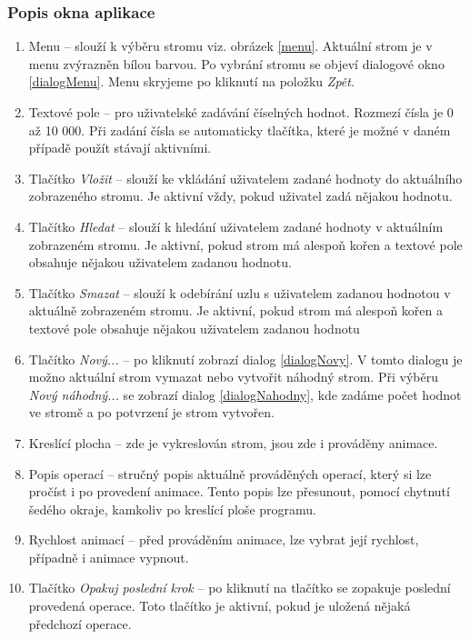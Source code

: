 \documentclass[
  biblatex=false,
  font=serif,
  glossaries=false,
  tables=false,
  theorems=false,
  index
]{kidiplom}
\begin{document}
\subsubsection{Popis okna aplikace} 
\begin{enumerate}
\item Menu -- slouží k výběru stromu viz. obrázek \ref{menu}. Aktuální strom je v menu zvýrazněn bílou barvou. Po vybrání stromu se objeví dialogové okno \ref{dialogMenu}. Menu skryjeme po kliknutí na položku \textit{Zpět}.
\item Textové pole -- pro uživatelské zadávání číselných hodnot. Rozmezí čísla je 0 až 10 000. Při zadání čísla se automaticky tlačítka, které je možné v daném případě použít stávají aktivními. 
\item Tlačítko \textit{Vložit} -- slouží ke vkládání uživatelem zadané hodnoty do aktuálního zobrazeného stromu. Je aktivní vždy, pokud uživatel zadá nějakou hodnotu.
\item Tlačítko \textit{Hledat} -- slouží k hledání uživatelem zadané hodnoty v aktuálním zobrazeném stromu. Je aktivní, pokud strom má alespoň kořen a textové pole obsahuje nějakou uživatelem zadanou hodnotu.
\item Tlačítko \textit{Smazat} -- slouží k odebírání uzlu s uživatelem zadanou hodnotou v aktuálně zobrazeném stromu. Je aktivní, pokud strom má alespoň kořen a textové pole obsahuje nějakou uživatelem zadanou hodnotu
\item Tlačítko \textit{Nový...} -- po kliknutí zobrazí dialog \ref{dialogNovy}. V tomto dialogu je možno aktuální strom vymazat nebo vytvořit náhodný strom. Při výběru \textit{Nový náhodný...} se zobrazí dialog \ref{dialogNahodny}, kde zadáme počet hodnot ve stromě a po potvrzení je strom vytvořen.
\item Kreslící plocha -- zde je vykreslován strom, jsou zde i prováděny animace.
\item Popis operací -- stručný popis aktuálně prováděných operací, který si lze pročíst i po provedení animace. Tento popis lze přesunout, pomocí chytnutí šedého okraje, kamkoliv po kreslící ploše programu. 
\item Rychlost animací -- před prováděním animace, lze vybrat její rychlost, případně i animace vypnout. 
\item Tlačítko \textit{Opakuj poslední krok} -- po kliknutí na tlačítko se zopakuje poslední provedená operace. Toto tlačítko je aktivní, pokud je uložená nějaká předchozí operace.
\end{enumerate}
\end{document}
